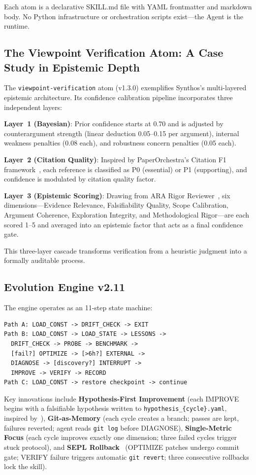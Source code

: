 \documentclass[review]{elsarticle}
\begin{document}
Each atom is a declarative SKILL.md file with YAML frontmatter and markdown body. No Python infrastructure or orchestration scripts exist---the Agent is the runtime.

\subsection{The Viewpoint Verification Atom: A Case Study in Epistemic Depth}

The \texttt{viewpoint-verification} atom (v1.3.0) exemplifies Synthos's multi-layered epistemic architecture. Its confidence calibration pipeline incorporates three independent layers:

\textbf{Layer~1 (Bayesian)}: Prior confidence starts at 0.70 and is adjusted by counterargument strength (linear deduction 0.05--0.15 per argument), internal weakness penalties (0.08 each), and robustness concern penalties (0.05 each).

\textbf{Layer~2 (Citation Quality)}: Inspired by PaperOrchestra's Citation F1 framework~\cite{song2026paperorchestra}, each reference is classified as P0 (essential) or P1 (supporting), and confidence is modulated by citation quality factor.

\textbf{Layer~3 (Epistemic Scoring)}: Drawing from ARA Rigor Reviewer~\cite{orchestra2026airesearch}, six dimensions---Evidence Relevance, Falsifiability Quality, Scope Calibration, Argument Coherence, Exploration Integrity, and Methodological Rigor---are each scored 1--5 and averaged into an epistemic factor that acts as a final confidence gate.

This three-layer cascade transforms verification from a heuristic judgment into a formally auditable process.

\subsection{Evolution Engine v2.11}

The engine operates as an 11-step state machine:

\begin{verbatim}
Path A: LOAD_CONST -> DRIFT_CHECK -> EXIT
Path B: LOAD_CONST -> LOAD_STATE -> LESSONS ->
  DRIFT_CHECK -> PROBE -> BENCHMARK ->
  [fail?] OPTIMIZE -> [>6h?] EXTERNAL ->
  DIAGNOSE -> [discovery?] INTERRUPT ->
  IMPROVE -> VERIFY -> RECORD
Path C: LOAD_CONST -> restore checkpoint -> continue
\end{verbatim}

Key innovations include \textbf{Hypothesis-First Improvement} (each IMPROVE begins with a falsifiable hypothesis written to \texttt{hypothesis\_\{cycle\}.yaml}, inspired by~\cite{haiyang2025aris}), \textbf{Git-as-Memory} (each cycle creates a branch; passes are kept, failures reverted; agent reads \texttt{git log} before DIAGNOSE), \textbf{Single-Metric Focus} (each cycle improves exactly one dimension; three failed cycles trigger stuck protocol), and \textbf{SEPL Rollback}~\cite{skyworkai2026deep} (OPTIMIZE patches undergo commit gate; VERIFY failure triggers automatic \texttt{git revert}; three consecutive rollbacks lock the skill).
\end{document}

